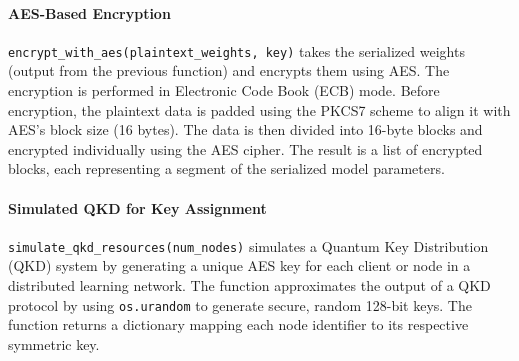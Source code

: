 \documentclass[10pt]{article}
\begin{document}
\paragraph{AES-Based Encryption}
\texttt{encrypt\_with\_aes(plaintext\_weights, key)} takes the serialized weights (output from the previous function) and encrypts them using AES. The encryption is performed in Electronic Code Book (ECB) mode. Before encryption, the plaintext data is padded using the PKCS7 scheme to align it with AES’s block size (16 bytes). The data is then divided into 16-byte blocks and encrypted individually using the AES cipher. The result is a list of encrypted blocks, each representing a segment of the serialized model parameters.
\paragraph{Simulated QKD for Key Assignment}
\texttt{simulate\_qkd\_resources(num\_nodes)} simulates a Quantum Key Distribution (QKD) system by generating a unique AES key for each client or node in a distributed learning network. The function approximates the output of a QKD protocol by using \texttt{os.urandom} to generate secure, random 128-bit keys. The function returns a dictionary mapping each node identifier to its respective symmetric key.
\end{document}
